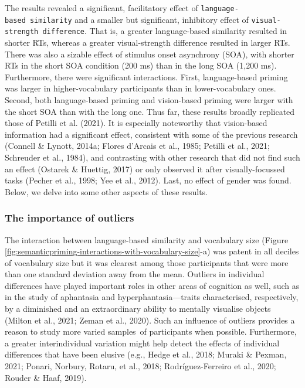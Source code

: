 \documentclass[
  12pt,
  man,floatsintext]{apa7}
\begin{document}
The results revealed a significant, facilitatory effect of \texttt{language-based\ similarity} and a smaller but significant, inhibitory effect of \texttt{visual-strength\ difference}. That is, a greater language-based similarity resulted in shorter RTs, whereas a greater visual-strength difference resulted in larger RTs. There was also a sizable effect of stimulus onset asynchrony (SOA), with shorter RTs in the short SOA condition (200 ms) than in the long SOA (1,200 ms). Furthermore, there were significant interactions. First, language-based priming was larger in higher-vocabulary participants than in lower-vocabulary ones. Second, both language-based priming and vision-based priming were larger with the short SOA than with the long one. Thus far, these results broadly replicated those of Petilli et al. (2021). It is especially noteworthy that vision-based information had a significant effect, consistent with some of the previous research (Connell \& Lynott, 2014a; Flores d'Arcais et al., 1985; Petilli et al., 2021; Schreuder et al., 1984), and contrasting with other research that did not find such an effect (Ostarek \& Huettig, 2017) or only observed it after visually-focussed tasks (Pecher et al., 1998; Yee et al., 2012). Last, no effect of gender was found. Below, we delve into some other aspects of these results.

\hypertarget{the-importance-of-outliers}{%
\subsubsection{The importance of outliers}\label{the-importance-of-outliers}}

The interaction between language-based similarity and vocabulary size (Figure \ref{fig:semanticpriming-interactions-with-vocabulary-size}-a) was patent in all deciles of vocabulary size but it was clearest among those participants that were more than one standard deviation away from the mean. Outliers in individual differences have played important roles in other areas of cognition as well, such as in the study of aphantasia and hyperphantasia---traits characterised, respectively, by a diminished and an extraordinary ability to mentally visualise objects (Milton et al., 2021; Zeman et al., 2020). Such an influence of outliers provides a reason to study more varied samples~of participants when possible. Furthermore, a greater interindividual variation might help detect the effects of individual differences that have been elusive (e.g., Hedge et al., 2018; Muraki \& Pexman, 2021; Ponari, Norbury, Rotaru, et al., 2018; Rodríguez-Ferreiro et al., 2020; Rouder \& Haaf, 2019).
\end{document}
